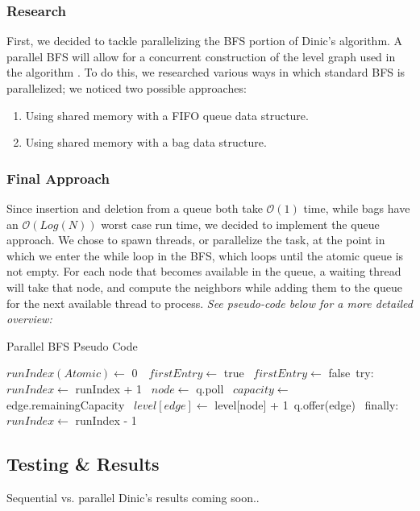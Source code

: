     \subsubsection{Research}
        First, we decided to tackle parallelizing the BFS portion of Dinic's algorithm. A parallel BFS will allow for a concurrent construction of the level graph used in the algorithm \cite{pBFS}. To do this, we researched various ways in which standard BFS is parallelized; we noticed two possible approaches:
            \begin{enumerate}
                \item Using shared memory with a FIFO queue data structure.
                \item Using shared memory with a bag data structure.
            \end{enumerate}

    \subsubsection{Final Approach}
        Since insertion and deletion from a queue both take $\mathcal{O}(1)$ time, while bags have an $\mathcal{O}(Log(N))$ worst case run time, we decided to implement the queue approach. We chose to spawn threads, or parallelize the task, at the point in which we enter the while loop in the BFS, which loops until the atomic queue is not empty. For each node that becomes available in the queue, a waiting thread will take that node, and compute the neighbors while adding them to the queue for the next available thread to process. \emph{See pseudo-code below for a more detailed overview:}
        
    \begin{algorithm} 
        \caption{Parallel BFS Pseudo Code}
        \label{alg:DParallel}
        \begin{algorithmic}[1]
            \State $runIndex(Atomic) \gets$ 0\
            \
                \State $firstEntry \gets$ true\
                    \State $firstEntry \gets$ false\
                    \State try:\
                        \State $runIndex \gets$ runIndex + 1\
                            \State $node \gets$ q.poll\
                                \State $capacity \gets$ edge.remainingCapacity\
                                    \State $level[edge] \gets$ level[node] + 1\
                                    \State q.offer(edge)\
                                \EndIf
                            \EndFor
                        \EndWhile    
                    \State finally:\
                        \State $runIndex \gets$ runIndex - 1\
                \EndWhile        
            \EndFunction
        \end{algorithmic}
    \end{algorithm}       
\subsection{Testing \& Results}   
Sequential vs. parallel Dinic's results coming soon..